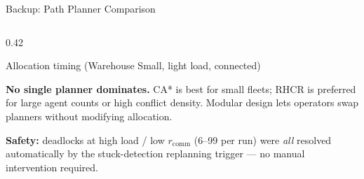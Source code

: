 \documentclass[aspectratio=169, 11pt]{beamer}
\newcommand{\mutedtext}[1]{{\rmfamily\small\color{TextMuted} #1}}
\newcommand{\comm}{r_{\mathrm{comm}}}
\begin{document}
\begin{frame}{Backup: Path Planner Comparison}
\begin{columns}[T]
    \begin{column}{0.42\textwidth}
      \begin{plaincard}{Allocation timing (Warehouse Small, light load, connected)}
        \vspace{-2pt}
        {\rmfamily\small
        \renewcommand{\arraystretch}{1.3}
        }
      \end{plaincard}
      \vspace{8pt}
      \begin{warnbox}
        \textbf{No single planner dominates.} CA* is best for small
        fleets; RHCR is preferred for large agent counts or high
        conflict density. Modular design lets operators swap
        planners without modifying allocation.
      \end{warnbox}
      \vspace{6pt}
      \mutedtext{\textbf{Safety:} deadlocks at high load / low
        $\comm$ (6--99 per run) were \emph{all} resolved automatically
        by the stuck-detection replanning trigger — no manual
        intervention required.}
    \end{column}
  \end{columns}
\end{frame}
\end{document}
